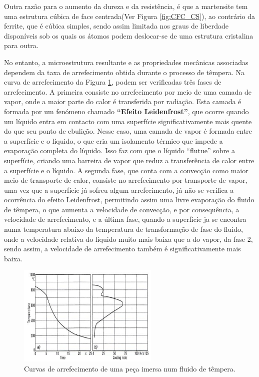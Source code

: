 \par
Outra razão para o aumento da dureza e da resistência, é que a martensite tem uma estrutura cúbica de face centrada(Ver Figura \ref{fig:CFC_CS}), ao contrário da ferrite, que é cúbica simples, sendo assim limitada nos graus de liberdade disponíveis sob os quais os átomos podem deslocar-se de uma estrutura cristalina para outra.
\par
No entanto, a microestrutura resultante e as propriedades mecânicas associadas dependem da taxa de arrefecimento obtida durante o processo de têmpera. Na curva de arrefecimento da Figura \ref{fig:tempera_arref}, podem ser verificadas três fases de arrefecimento. A primeira consiste no arrefecimento por meio de uma camada de vapor, onde a maior parte do calor é transferida por radiação. Esta camada é formada por um fenómeno chamado \textbf{“Efeito Leidenfrost”}, que ocorre quando um líquido entra em contacto com uma superfície significativamente mais quente do que seu ponto de ebulição. Nesse caso, uma camada de vapor é formada entre a superfície e o líquido, o que cria um isolamento térmico que impede a evaporação completa do líquido. Isso faz com que o líquido “flutue” sobre a superfície, criando uma barreira de vapor que reduz a transferência de calor entre a superfície e o líquido. A segunda fase, que conta com a convecção como maior meio de transporte de calor, consiste no arrefecimento por transporte de vapor, uma vez que a superfície já sofreu algum arrefecimento, já não se verifica a ocorrência do efeito Leidenfrost, permitindo assim uma livre evaporação do fluido de têmpera, o que aumenta a velocidade de convecção, e por consequência, a velocidade de arrefecimento, e a última fase, quando a superfície ja se encontra numa temperatura abaixo da temperatura de transformação de fase do fluido, onde a velocidade relativa do líquido muito mais baixa que a do vapor, da fase 2, sendo assim, a velocidade de arrefecimento também é significativamente mais baixa.
\begin{figure}[htb]
    \centering
    \includegraphics[width = 0.6\textwidth]{Figures/Cap2/Tempera_Arrefecimento.png}
    \caption[Curva de arrefecimento em fluido de têmpera]%
    {Curvas de arrefecimento de uma peça imersa num fluido de têmpera.}
    \label{fig:tempera_arref}
\end{figure}
